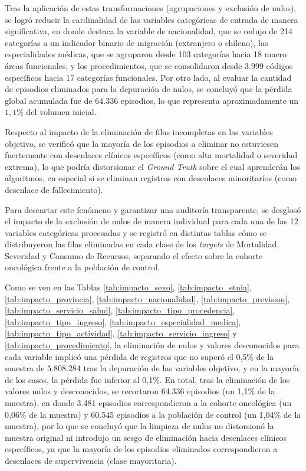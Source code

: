 Tras la aplicación de estas transformaciones (agrupaciones y exclusión de nulos), se logró reducir la cardinalidad de las variables categóricas de entrada de manera significativa, en donde destaca la variable de nacionalidad, que se redujo de 214 categorías a un indicador binario de migración (extranjero o chileno), las especialidades médicas, que se agruparon desde 103 categorías hacia 18 macro áreas funcionales, y los procedimientos, que se consolidaron desde 3.999 códigos específicos hacia 17 categorías funcionales. Por otro lado, al evaluar la cantidad de episodios eliminados para la depuración de nulos, se concluyó que la pérdida global acumulada fue de $64.336$ episodios, lo que representa aproximadamente un $1,1\%$ del volumen inicial.

Respecto al impacto de la eliminación de filas incompletas en las variables objetivo, se verificó que la mayoría de los episodios a eliminar no estuviesen fuertemente con desenlaces clínicos específicos (como alta mortalidad o severidad extrema), lo que podría distorsionar el \textit{Ground Truth} sobre el cual aprenderán los algoritmos, en especial si se eliminan registros con desenlaces minoritaríos (como desenlace de fallecimiento). 

Para descartar este fenómeno y garantizar una auditoría transparente, se desglosó el impacto de la exclusión de nulos de manera individual para cada una de las 12 variables categóricas procesadas y se registró en distintas tablas cómo se distribuyeron las filas eliminadas en cada clase de los \textit{targets} de Mortalidad, Severidad y Consumo de Recursos, separando el efecto sobre la cohorte oncológica frente a la población de control.

Como se ven en las Tablas \ref{tab:impacto_sexo}, \ref{tab:impacto_etnia}, \ref{tab:impacto_provincia}, \ref{tab:impacto_nacionalidad}, \ref{tab:impacto_prevision}, \ref{tab:impacto_servicio_salud}, \ref{tab:impacto_tipo_procedencia}, \ref{tab:impacto_tipo_ingreso}, \ref{tab:impacto_especialidad_medica}, \ref{tab:impacto_tipo_actividad}, \ref{tab:impacto_servicio_ingreso} y \ref{tab:impacto_procedimiento}, la eliminación de nulos y valores desconocidos para cada variable implicó una pérdida de registros que no superó el 0,5\% de la muestra de $5.808.284$ tras la depuración de las variables objetivo, y en la mayoría de los casos, la pérdida fue inferior al 0,1\%. En total, tras la eliminación de los valores nulos y desconocidos, se recortaron 64.336 episodios (un 1,1\% de la muestra), en donde 3.481 episodios correspondieron a la cohorte oncológica (un 0,06\% de la muestra) y 60.545 episodios a la población de control (un 1,04\% de la muestra), por lo que se concluyó que la limpieza de nulos no distorsionó la muestra original ni introdujo un sesgo de eliminación hacia desenlaces clínicos específicos, ya que la mayoría de los episodios eliminados correspondieron a desenlaces de supervivencia (clase mayoritaria).


